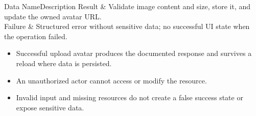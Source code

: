 \begin{specdatatable}{Data Name}{Description}
Result & Validate image content and size, store it, and update the owned avatar URL.\\ \hline
Failure & Structured error without sensitive data; no successful UI state when the operation failed.\\ \hline
\end{specdatatable}

\begin{itemize}[leftmargin=1.6em,topsep=3pt,itemsep=2pt,parsep=0pt,label=$\bullet$]
    \item Successful upload avatar produces the documented response and survives a reload where data is persisted.
    \item An unauthorized actor cannot access or modify the resource.
    \item Invalid input and missing resources do not create a false success state or expose sensitive data.
\end{itemize}
